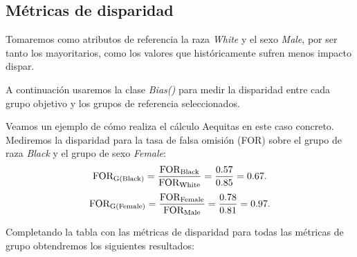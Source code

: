 \subsection*{Métricas de disparidad}

Tomaremos como atributos de referencia la raza \textit{White} y el sexo \textit{Male}, por ser tanto los mayoritarios, como los valores que históricamente sufren menos impacto dispar.

A continuación usaremos la clase \textit{Bias()} para medir la disparidad entre cada grupo objetivo y los grupos de referencia seleccionados. 

Veamos un ejemplo de cómo realiza el cálculo Aequitas en este caso concreto. Mediremos la disparidad para la tasa de falsa omisión (FOR) sobre el grupo de raza \textit{Black} y el grupo de sexo \textit{Female}:
$$\text{FOR}_{\text{G(Black)}}=\frac{\displaystyle \text{FOR}_{\text{Black}}}{\displaystyle \text{FOR}_{\text{White}}}=\frac{\displaystyle 0.57}{\displaystyle 0.85}=0.67.$$
$$\text{FOR}_{\text{G(Female)}}=\frac{\displaystyle \text{FOR}_{\text{Female}}}{\displaystyle \text{FOR}_{\text{Male}}}=\frac{\displaystyle 0.78}{\displaystyle 0.81}=0.97.$$

Completando la tabla con las métricas de disparidad para todas las métricas de grupo obtendremos los siguientes resultados:

